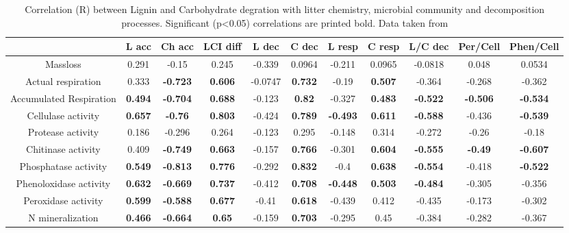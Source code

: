 \documentclass[authoryear,preprint,review,12pt]{elsarticle}
\begin{document}
\begin{table}[h!]
\begin{center}
\caption{Correlation (R) between Lignin and Carbohydrate degration with litter chemistry, microbial community and decomposition processes. Significant (p<0.05) correlations are printed bold. Data taken from \cite{Mooshammer2011, Leitner2011}}
\label{corrtable}
{\tiny
\begin{tabular}{ccccccccccc}
  \hline
 & L acc & Ch acc & LCI diff & L dec & C dec & L resp & C resp & L/C dec & Per/Cell & Phen/Cell \\ 
  \hline
Massloss & 0.291 & -0.15 & 0.245 & -0.339 & 0.0964 & -0.211 & 0.0965 & -0.0818 & 0.048 & 0.0534 \\ 
  Actual respiration & 0.333 & \textbf{ -0.723 } & \textbf{ 0.606 } & -0.0747 & \textbf{ 0.732 } & -0.19 & \textbf{ 0.507 } & -0.364 & -0.268 & -0.362 \\ 
  Accumulated Respiration & \textbf{ 0.494 } & \textbf{ -0.704 } & \textbf{ 0.688 } & -0.123 & \textbf{ 0.82 } & -0.327 & \textbf{ 0.483 } & \textbf{ -0.522 } & \textbf{ -0.506 } & \textbf{ -0.534 } \\ 
  Cellulase activity & \textbf{ 0.657 } & \textbf{ -0.76 } & \textbf{ 0.803 } & -0.424 & \textbf{ 0.789 } & \textbf{ -0.493 } & \textbf{ 0.611 } & \textbf{ -0.588 } & -0.436 & \textbf{ -0.539 } \\ 
  Protease activity & 0.186 & -0.296 & 0.264 & -0.123 & 0.295 & -0.148 & 0.314 & -0.272 & -0.26 & -0.18 \\ 
  Chitinase activity & 0.409 & \textbf{ -0.749 } & \textbf{ 0.663 } & -0.157 & \textbf{ 0.766 } & -0.301 & \textbf{ 0.604 } & \textbf{ -0.555 } & \textbf{ -0.49 } & \textbf{ -0.607 } \\ 
  Phosphatase activity & \textbf{ 0.549 } & \textbf{ -0.813 } & \textbf{ 0.776 } & -0.292 & \textbf{ 0.832 } & -0.4 & \textbf{ 0.638 } & \textbf{ -0.554 } & -0.418 & \textbf{ -0.522 } \\ 
  Phenoloxidase activity & \textbf{ 0.632 } & \textbf{ -0.669 } & \textbf{ 0.737 } & -0.412 & \textbf{ 0.708 } & \textbf{ -0.448 } & \textbf{ 0.503 } & \textbf{ -0.484 } & -0.305 & -0.356 \\ 
  Peroxidase activity & \textbf{ 0.599 } & \textbf{ -0.588 } & \textbf{ 0.677 } & -0.41 & \textbf{ 0.618 } & -0.439 & 0.412 & -0.435 & -0.173 & -0.302 \\ 
  N mineralization & \textbf{ 0.466 } & \textbf{ -0.664 } & \textbf{ 0.65 } & -0.159 & \textbf{ 0.703 } & -0.295 & 0.45 & -0.384 & -0.282 & -0.367 \\ 

\end{tabular}}
\end{center}
\end{table}
\end{document}
